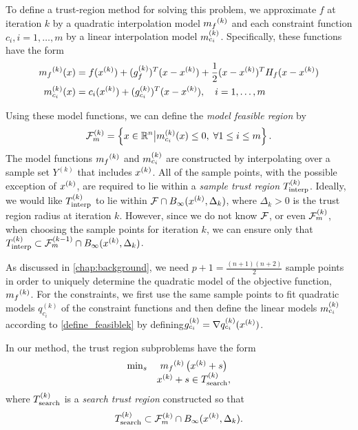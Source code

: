 To define a trust-region method for solving this problem,  we approximate $f$ at iteration $k$ by a quadratic interpolation model ${{m}_f}^{(k)}$ and each constraint function $c_i,  i=1,\ldots,m$ by a linear interpolation model ${{m}^{(k)}_{c_i}}$.     Specifically,  these functions have the form
\begin{align} {{m}_f}^{(k)}(x) & = f(x^{(k)})+(g_f^{(k)})^T(x-x^{(k)}) + \frac{1}{2}(x-x^{(k)})^T H_f (x-x^{(k)}) \\
{{m}^{(k)}_{c_i}}(x) & = c_i(x^{(k)}) + (g_{c_i}^{(k)})^T(x-x^{(k)}), \quad i=1,\ldots, m \label{mcik_definition}
\end{align}




Using these model functions, we can define the {\em model feasible region} by
\begin{align}
{\mathcal F_m^{(k)}} = \left\{x \in \mathbb R^n \big| {{m}^{(k)}_{c_i}}(x) \le 0, \; \forall 1 \le i \le m \right\}.
\end{align}
The model functions ${{m}_f}^{(k)}$ and ${{m}^{(k)}_{c_i}}$ are constructed by interpolating over a sample set $Y^{(k)}$ that includes $x^{(k)}$.   All of the sample points,  with the possible exception of $x^{(k)}$, are required to lie within a  {\em sample trust region} ${T_{\text{interp}}^{(k)}}$.   
Ideally,  we would like ${T_{\text{interp}}^{(k)}}$  to lie within ${\mathcal F} \cap B_\infty(x^{(k)},\Delta_k)$, where $\Delta_k>0$ is the trust region radius at iteration $k$.     However, since we do not know ${\mathcal F}$,  or even ${\mathcal F_m^{(k)}}$, when choosing the sample points for iteration $k$,  we can ensure only that ${T_{\text{interp}}^{(k)}} \subset \mathcal{F}^{(k-1)}_m \cap B_{\infty}(x^{(k)},\Delta_k)$. 

As discussed in \cref{chap:background}, we need 
 $p+1 = \frac{(n+1)(n+2)}{2}$ sample points in order to uniquely determine the quadratic model of the objective function, ${{m}_f}^{(k)}$.      For the constraints, we first use the same sample points to fit quadratic models $q_{c_i}^{(k)}$ of the constraint functions and then define the linear models ${{m}^{(k)}_{c_i}}$ according to \cref{define_feasiblek}  by defining$g_{c_i}^{(k)} = \nabla q_{c_i}^{(k)}(x^{(k)})$.   




In our method, the trust region subproblems have the form
\begin{align*} \label{trust_problem_nlp}
\begin{array}{ccl} \min_{s}
 & {{m}_f}^{(k)} \left(x^{(k)}+s\right) \\
 & x^{(k)}+s \in {T_{\text{search}}^{(k)}},
 \end{array}
\end{align*}
where ${T_{\text{search}}^{(k)}}$ is a {\em search trust region} constructed so that 
\[ {T_{\text{search}}^{(k)}} \subset {\mathcal F_m^{(k)}} \cap B_\infty(x^{(k)},\Delta_k).\] 

